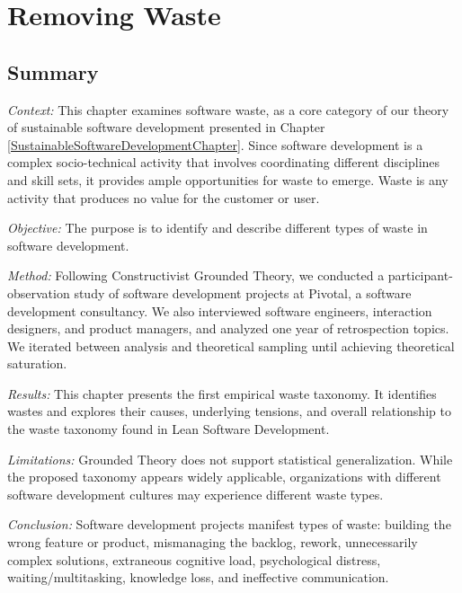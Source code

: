 \chapter{Removing Waste}
\label{SoftwareEngineeringWasteChapter}
\section{Summary}

\textit{Context:} This chapter examines software waste, as a core category of our theory of sustainable software development presented in Chapter \ref{SustainableSoftwareDevelopmentChapter}. Since software development is a complex socio-technical activity that involves coordinating different disciplines and skill sets, it provides ample opportunities for waste to emerge. Waste is any activity that produces no value for the customer or user.

\textit{Objective:} The purpose is to identify and describe different types of waste in software development.

\textit{Method:} Following Constructivist Grounded Theory, we conducted a \durationOfResearchStudyAdjective{} participant-observation study of \numberOfObservedProjects{} software development projects at Pivotal, a software development consultancy. We also interviewed \numberOfInterviews{} software engineers, interaction designers, and product managers, and analyzed one year of retrospection topics. We iterated between analysis and theoretical sampling until achieving theoretical saturation.

\textit{Results:} This chapter presents the first empirical waste taxonomy. It identifies \numberOfWastes{} wastes and explores their causes, underlying tensions, and overall relationship to the waste taxonomy found in Lean Software Development.

\textit{Limitations:} Grounded Theory does not support statistical generalization. While the proposed taxonomy appears widely applicable, organizations with different software development cultures may experience different waste types.

\textit{Conclusion:} Software development projects manifest \numberOfWastes{} types of waste: building the wrong feature or product, mismanaging the backlog, rework, unnecessarily complex solutions, extraneous cognitive load, psychological distress, waiting/multitasking, knowledge loss, and ineffective communication.


